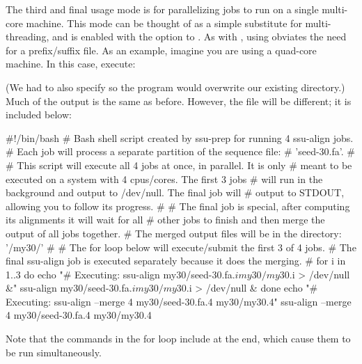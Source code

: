 The third and final  usage mode is for parallelizing
jobs to run on a single multi-core machine. This mode can be thought
of as a simple substitute for multi-threading, and is enabled with the
 option to . As with , using
 obviates the need for a prefix/suffix file. As an example,
imagine you are using a quad-core machine. In this case, execute: 


(We had to also specify  so the program would overwrite our
existing  directory.) Much of the output is the same as
before. However, the  file will be different;
it is included below:

\begin{sreoutput}
#!/bin/bash
# Bash shell script created by ssu-prep for running 4 ssu-align jobs.
# Each job will process a separate partition of the sequence file:
# 'seed-30.fa'.
#
# This script will execute all 4 jobs at once, in parallel. It is only
# meant to be executed on a system with 4 cpus/cores. The first 3 jobs
# will run in the background and output to /dev/null. The final job will
# output to STDOUT, allowing you to follow its progress.
#
# The final job is special, after computing its alignments it will wait for all
# other jobs to finish and then merge the output of all jobs together.
# The merged output files will be in the directory: '/my30/'
#
# The for loop below will execute/submit the first 3 of 4 jobs.
# The final ssu-align job is executed separately because it does the merging.
#
for i in {1..3}
do
	echo "# Executing: ssu-align my30/seed-30.fa.$i my30/my30.$i > /dev/null &"
	ssu-align my30/seed-30.fa.$i my30/my30.$i > /dev/null &
done
echo "# Executing: ssu-align --merge 4 my30/seed-30.fa.4 my30/my30.4"
ssu-align --merge 4 my30/seed-30.fa.4 my30/my30.4
\end{sreoutput}

Note that the  commands in the for loop include
\prog{\&} at the end, which cause them to be run simultaneously.









